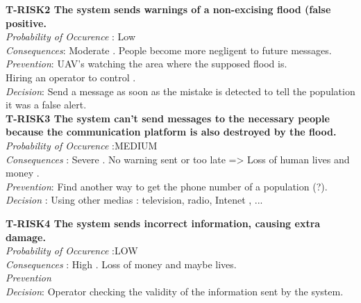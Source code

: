 	
	\textbf{ T-RISK2 The system sends warnings of a non-excising flood (false positive.} \\
	\textit{Probability of Occurence} : Low \\
	\textit{Consequences}: Moderate . People become more negligent to future messages. \\
	\textit{Prevention}: UAV's watching the area where the supposed flood is.\\
	Hiring an operator to control . \\
	\textit{Decision}: Send a message as soon as the mistake is detected to tell the population it was a false alert. \\

	
	\textbf{ T-RISK3 The system can't send messages to the necessary people because the communication platform is also destroyed by the flood.} \\
	\textit{Probability of Occurence} :MEDIUM\\
	\textit{Consequences} : Severe . No warning sent or too late => Loss of human lives and money .\\
	\textit{Prevention}: Find another way to get the phone number of a population (?). \\
	\textit{Decision} : Using other medias : television, radio, Intenet , ...
	
	\textbf{ T-RISK4 The system sends incorrect information, causing extra damage.} \\
	\textit{Probability of Occurence} :LOW\\
	\textit{Consequences} : High . Loss of money and maybe lives.\\
	\textit{Prevention} \\
	\textit{Decision}: Operator checking the validity of the information sent by the system. \\
	
